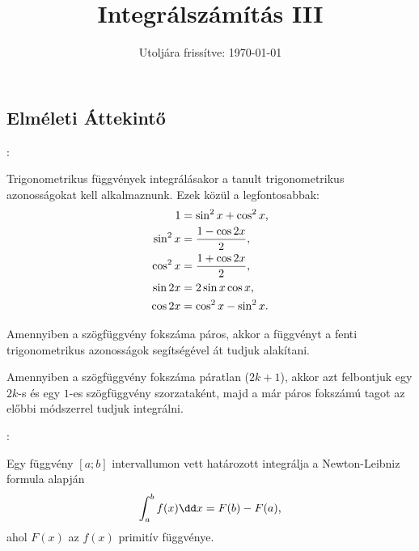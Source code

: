 \documentclass[a4paper, 12pt]{scrartcl}
\title{Integrálszámítás III}
\date{Utoljára frissítve: \today}
\begin{document}
\maketitle

\subsection{Elméleti Áttekintő}


\begin{blueBox}
  :

  Trigonometrikus függvények integrálásakor a tanult trigonometrikus
  azonosságokat kell alkalmaznunk. Ezek közül a legfontosabbak:
  \begin{align*}
    1        & = \sin^2 x + \cos^2 x \text,   \\
    \sin^2 x & = \frac{1 - \cos 2x}{2} \text, \\
    \cos^2 x & = \frac{1 + \cos 2x}{2} \text, \\
    \sin 2x  & = 2 \sin x \cos x \text,       \\
    \cos 2x  & = \cos^2 x - \sin^2 x \text.
  \end{align*}

  Amennyiben a szögfüggvény fokszáma páros, akkor a függvényt a fenti
  trigonometrikus azonosságok segítségével át tudjuk alakítani.

  Amennyiben a szögfüggvény fokszáma páratlan ($2k + 1$), akkor azt felbontjuk
  egy $2k$-s és egy $1$-es szögfüggvény szorzataként, majd a már páros fokszámú
  tagot az előbbi módszerrel tudjuk integrálni.
\end{blueBox}

\begin{blueBox}
  :

  Egy függvény $[a; b]$ intervallumon vett határozott integrálja a
  Newton-Leibniz formula alapján
  \[
    \int_a^b f(x) \dd x = F(b) - F(a)
    \text,
  \]
  ahol $F(x)$ az $f(x)$ primitív függvénye.
\end{blueBox}
\end{document}
